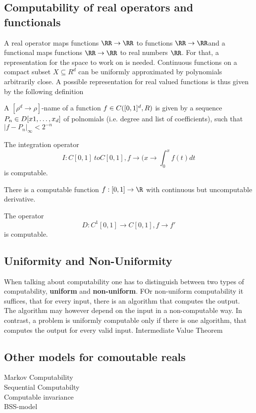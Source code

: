 \subsection{Computability of real operators and functionals}
A real operator maps functions $\RR \to \RR$ to functions $\RR \to \RR$and a functional maps functions $\RR \to \RR$ to real numbers $\RR$.
For that, a representation for the space to work on is needed.
Continuous functions on a compact subset $X \subseteq R^d$ can be uniformly approximated by polynomials arbitrarily close.
A possible representation for real valued functions is thus given by the following definition 
\begin{definition}
A $[\rho^d \to \rho]$-name of a function $f \in C([0,1]^d, \\R)$ is given by a sequence $P_n \in \\D[x1, \dots, x_d]$ of polnomials (i.e. degree and list of coefficients), such that $\vert f - P_n \vert_\infty < 2^{-n}$   
\begin{theorem}[name?]
The integration operator 
$$I: C[0,1] \ to C[0,1], f \to (x \to \int_0^x f(t) dt$$   
is computable.
\end{theorem}
\begin{theorem}[Myhill 1971]
There is a computable function $f: [0,1] \to \R$ with continuous but uncomputable derivative. 
\end{theorem}
\begin{theorem}
The operator 
$$ D: C^1[0,1] \to C[0,1], f \to f'$$
is computable.
\end{theorem}
\end{definition}
\subsection{Uniformity and Non-Uniformity}
When talking about computability one has to distinguish between two types of computability, \textbf{uniform} and \textbf{non-uniform}.
FOr non-uniform computability it suffices, that for every input, there is an algorithm that computes the output. 
The algorithm may however depend on the input in a non-computable way.
In contrast, a problem is uniformly computable only if there is one algorithm, that computes the output for every valid input. 
Intermediate Value Theorem
\subsection{Other models for comoutable reals}
Markov Computability \\ 
Sequential Computabilty \\
Computable invariance \\
BSS-model \\